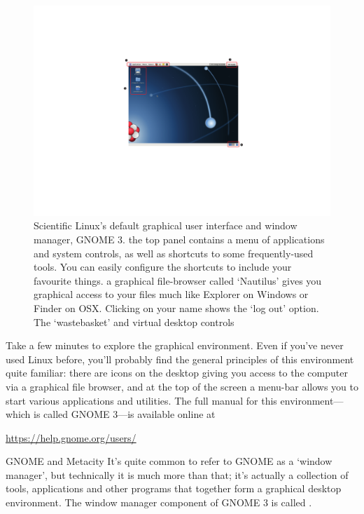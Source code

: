\begin{figure}[t]
\centerline{\includegraphics[width=16cm]{images/gnome-desktop}}
\caption{Scientific Linux's default graphical user interface and
  window manager, GNOME 3. \protect{} the top panel contains
  a menu of applications and system controls, as well as shortcuts to
  some frequently-used tools. You can easily configure the shortcuts
  to include your favourite things. \protect{} a graphical
  file-browser called `Nautilus' gives you graphical access to your
  files much like Explorer on Windows or Finder on
  OSX. \protect{} Clicking on your name shows the `log out'
  option. \protect{} The `wastebasket' and virtual desktop
  controls}\label{figure:gnome-desktop}
\end{figure}

Take a few minutes to explore the graphical environment. Even if you've never used Linux before, you'll probably find the general principles of this environment quite familiar: there are icons on the desktop giving you access to the computer via a graphical file browser, and at the top of the screen a menu-bar allows you to start various applications and utilities. The full manual for this environment---which is called GNOME 3---is available online at

\noindent\url{https://help.gnome.org/users/}

\begin{linux}{GNOME and Metacity}
It's quite common to refer to GNOME as a `window manager', but technically it is much more than that; it's actually a collection of tools, applications and other programs that together form a graphical desktop environment. The window manager component of GNOME 3 is called .
\end{linux}

